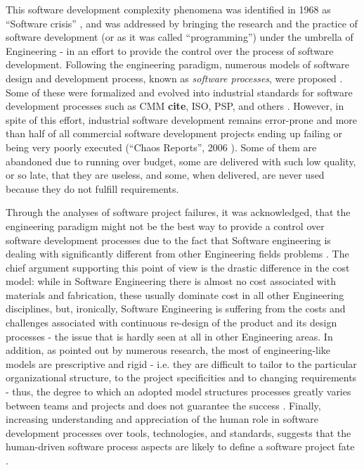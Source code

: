 This software development complexity phenomena was identified in 1968 as ``Software crisis'' 
\cite{naur_crisis_68}, and was addressed by bringing the research and the practice of software development 
(or as it was called ``programming'') under the umbrella of Engineering - in an effort to provide 
the control over the process of software development. 
Following the engineering paradigm, numerous models of software design and development 
process, known as \textit{software processes}, were proposed \cite{citeulike:10002165}.
Some of these were formalized and evolved into industrial standards for software development processes 
such as CMM \textbf{cite}, ISO, PSP, and others \cite{citeulike:5043104}. 
However, in spite of this effort, industrial software  development remains error-prone and more 
than half of all commercial software development projects ending up failing or being very poorly executed 
(``Chaos Reports'', 2006 \cite{chaos2006}). Some of them are abandoned due to running 
over budget, some are delivered with such low quality, or so late, that they are useless, and some, 
when delivered, are never used because they do not fulfill requirements. 

Through the analyses of software project failures, it was acknowledged, that the engineering 
paradigm might not be the best way to provide a control over software development processes 
due to the fact that Software engineering is dealing with significantly different from other 
Engineering fields problems \cite{citeulike:3729379} \cite{citeulike:5203446} \cite{citeulike:2207657}.
The chief argument supporting this point of view is the drastic difference in the cost model:
while in Software Engineering there is almost no cost associated with materials and 
fabrication, these usually dominate cost in all other Engineering disciplines, but, 
ironically, Software Engineering is suffering from the costs and challenges associated with 
continuous re-design of the product and its design processes - the issue that is 
hardly seen at all in other Engineering areas. 
In addition, as pointed out by numerous research, the most of engineering-like models are 
prescriptive and rigid - i.e. they are difficult to tailor to the particular organizational structure,
to the project specificities and to changing requirements - thus, the degree to which an adopted model 
structures processes greatly varies between teams and projects and does not guarantee the success \cite{sacchi_2001}. 
Finally, increasing understanding and appreciation of the human role in software development 
processes over tools, technologies, and standards, suggests that the human-driven software process 
aspects are likely to define a software project fate \cite{citeulike:6580825} \cite{citeulike:149387} 
\cite{1605185} \cite{citeulike:113403} \cite{citeulike:12743107}. 

